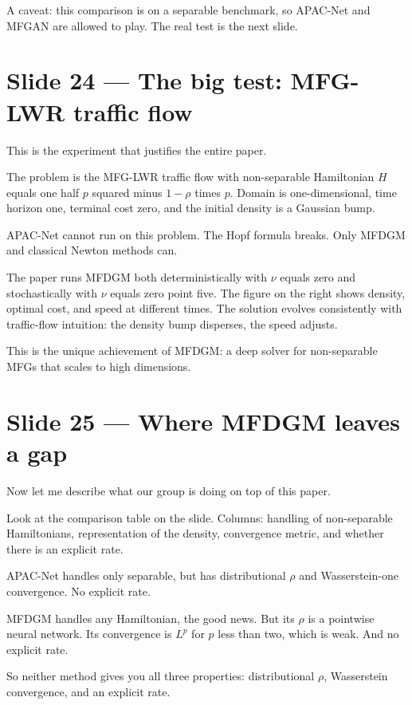 \documentclass[11pt]{article}
\begin{document}
A caveat: this comparison is on a separable benchmark, so APAC-Net and
MFGAN are allowed to play.  The real test is the next slide.

\section*{Slide 24 --- The big test: MFG-LWR traffic flow}

This is the experiment that justifies the entire paper.

The problem is the MFG-LWR traffic flow with non-separable Hamiltonian
$H$ equals one half $p$ squared minus $1-\rho$ times $p$.  Domain is
one-dimensional, time horizon one, terminal cost zero, and the initial
density is a Gaussian bump.

APAC-Net cannot run on this problem.  The Hopf formula breaks.  Only
MFDGM and classical Newton methods can.

The paper runs MFDGM both deterministically with $\nu$ equals zero and
stochastically with $\nu$ equals zero point five.  The figure on the
right shows density, optimal cost, and speed at different times.  The
solution evolves consistently with traffic-flow intuition: the density
bump disperses, the speed adjusts.

This is the unique achievement of MFDGM: a deep solver for non-separable
MFGs that scales to high dimensions.

\section*{Slide 25 --- Where MFDGM leaves a gap}

Now let me describe what our group is doing on top of this paper.

Look at the comparison table on the slide.  Columns: handling of
non-separable Hamiltonians, representation of the density, convergence
metric, and whether there is an explicit rate.

APAC-Net handles only separable, but has distributional $\rho$ and
Wasserstein-one convergence.  No explicit rate.

MFDGM handles any Hamiltonian, the good news.  But its $\rho$ is a
pointwise neural network.  Its convergence is $L^p$ for $p$ less than
two, which is weak.  And no explicit rate.

So neither method gives you all three properties: distributional $\rho$,
Wasserstein convergence, and an explicit rate.
\end{document}
